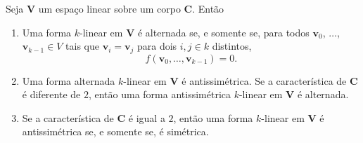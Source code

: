 \begin{prop}
Seja $\bm V$ um espaço linear sobre um corpo $\bm C$. Então
\begin{enumerate}
\item Uma forma $k$-linear em $\bm V$ é alternada se, e somente se, para todos $\bm v_0$, $\ldots$, $\bm v_{k-1} \in V$ tais que $\bm v_i = \bm v_j$ para dois $i,j \in k$ distintos,
	\begin{equation*}
	f(\bm v_0,\ldots,\bm v_{k-1})=0.
	\end{equation*} 
\item Uma forma alternada $k$-linear em $\bm V$ é antissimétrica. Se a característica de $\bm C$ é diferente de $2$, então uma forma antissimétrica $k$-linear em $\bm V$  é alternada.
\item Se a característica de $\bm C$ é igual a $2$, então uma forma $k$-linear em $\bm V$ é antissimétrica se, e somente se, é simétrica.
\end{enumerate}
\end{prop}
